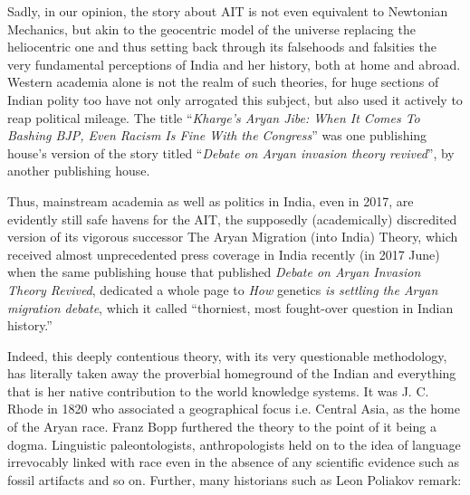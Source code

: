 Sadly, in our opinion, the story about AIT is not even equivalent to Newtonian Mechanics, but akin to the geocentric model of the universe replacing the heliocentric one and thus setting back through its falsehoods and falsities the very fundamental perceptions of India and her history, both at home and abroad. Western academia alone is not the realm of such theories, for huge sections of Indian polity too have not only arrogated this subject, but also used it actively to reap political mileage. The title “\textit{Kharge’s Aryan Jibe: When It Comes To Bashing BJP, Even Racism Is Fine With the Congress}” was one publishing house’s version of the story titled “\textit{Debate on Aryan invasion theory revived}”, by another publishing house.

Thus, mainstream academia as well as politics in India, even in 2017, are evidently still safe havens for the AIT, the supposedly (academically) discredited version of its vigorous successor The Aryan Migration (into India) Theory, which received almost unprecedented press coverage in India recently (in 2017 June) when the same publishing house that published \textit{Debate on Aryan Invasion Theory Revived}, dedicated a whole page to \textit{How }genetics\textit{ is settling the Aryan migration debate}, which it called “thorniest, most fought-over question in Indian history.” 

Indeed, this deeply contentious theory, with its very questionable methodology, has literally taken away the proverbial homeground of the Indian and everything that is her native contribution to the world knowledge systems. It was J. C. Rhode in 1820 who associated a geographical focus i.e. Central Asia, as the home of the Aryan race. Franz Bopp furthered the theory to the point of it being a dogma. Linguistic paleontologists, anthropologists held on to the idea of language irrevocably linked with race even in the absence of any scientific evidence such as fossil artifacts and so on. Further, many historians such as Leon Poliakov remark:

